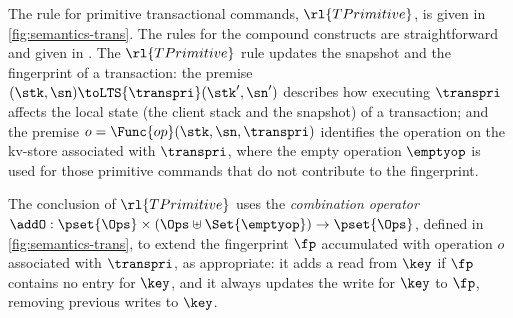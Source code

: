 \begin{figure*}[!t]
\begin{center}
\vspace*{5pt}

\hrulefill

\vspace*{5pt}

\noindent
{}
\end{center}

\spaceshrink{-5pt}

\hrulefill

\caption{The semantics of transactional commands}
\label{fig:semantics-trans}
\end{figure*}


The rule for primitive transactional commands, \( \rl{TPrimitive} \),
is given in \cref{fig:semantics-trans}.
The rules for the compound constructs are straightforward and given in \cite{shale-phd}.
The \( \rl{TPrimitive} \) rule updates 
the snapshot and the fingerprint of a transaction: the premise 
\((\stk, \sn) \toLTS{\transpri} (\stk', \sn')\) describes how executing
\(\transpri\) affects the local state (the client stack and the snapshot) of a transaction; 
and the premise \(o =\Func{op}(\stk, \sn, \transpri)\) identifies the operation on the kv-store associated with \(\transpri\), 
where the empty operation \(\emptyop\) is used for those primitive commands that do not
contribute to the fingerprint.

The conclusion of \( \rl{TPrimitive}\) uses the \emph{combination operator} 
\(\addO: \pset{\Ops} \times (\Ops \uplus \Set{\emptyop}) \to \pset{\Ops}\), defined 
in \cref{fig:semantics-trans}, to extend the fingerprint \(\fp\) accumulated with
operation \(o\) associated with \(\transpri\), as
appropriate: it adds a read from \(\key\)  if \(\fp\) 
contains no entry for \(\key\), and it always updates the write for 
\(\key\) to \(\fp\), removing previous writes to \(\key\).

